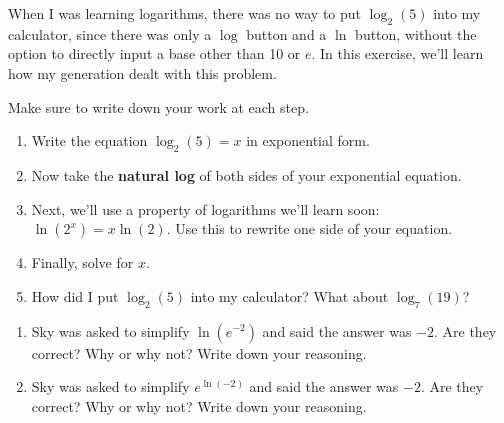 \documentclass[noauthor]{ximera}
\begin{document}
\begin{problem}
When I was learning logarithms, there was no way to put \(\log_2(5)\)
into my calculator, since there was only a \(\log\) button and a
\(\ln\) button, without the option to directly input a base other
than 10 or \(e\). In this exercise, we'll learn how my generation
dealt with this problem.
 
Make sure to write down your work at each step.
 
\begin{enumerate}
    \item Write the equation \(\log_2(5) = x\) in exponential form.
    \item Now take the \textbf{natural log} of both sides of your
    exponential equation.
    \item Next, we'll use a property of logarithms we'll learn soon:
    \(\ln(2^x) = x \ln(2)\). Use this to rewrite one side of your equation.
    \item Finally, solve for \(x\).
    \item How did I put \(\log_2(5)\) into my calculator? What about
    \(\log_7(19)\)?
\end{enumerate}
\end{problem}
 
\begin{problem}
\begin{enumerate}
    \item Sky was asked to simplify \(\ln(e^{-2})\) and said the answer was
    \(-2\). Are they correct? Why or why not? Write down your reasoning.
    \item Sky was asked to simplify \(e^{\ln(-2)}\) and said the answer was
    \(-2\). Are they correct? Why or why not? Write down your reasoning.
\end{enumerate}
\end{problem}
 
\end{document}
